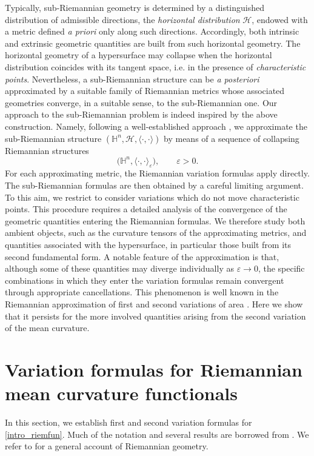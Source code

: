 \documentclass[11pt]{amsart}
\newcommand{\hhh}{{\mathcal{H}}}
\newcommand{\hh}{{\mathbb{H}}}
\newcommand{\eps}{\varepsilon}
\theoremstyle{definition}
\theoremstyle{remark}
\numberwithin{equation}{section}
\begin{document}
\medskip
Typically, sub-Riemannian geometry is determined by a distinguished distribution of admissible directions, the \emph{horizontal distribution} $\hhh$, endowed with a metric defined \emph{a priori} only along such directions. Accordingly, both intrinsic and extrinsic geometric quantities are built from such horizontal geometry. The horizontal geometry of a hypersurface may collapse when the horizontal distribution coincides with its tangent space, i.e. in the presence of \emph{characteristic points}. Nevertheless, a sub-Riemannian structure can be \emph{a posteriori} approximated by a suitable family of Riemannian metrics whose associated geometries converge, in a suitable sense, to the sub-Riemannian one.
Our approach to the sub-Riemannian problem is indeed inspired by the above construction. Namely, following a well-established approach \cite{MR2774306,MR2262784,MR4761954,MR2043961,MR5029815}, we approximate the sub-Riemannian structure $\left(\hh^n,\hhh,\langle\cdot,\cdot\rangle\right)$ by means of a sequence of collapsing Riemannian structures $$\big(\hh^n,\langle\cdot,\cdot\rangle_\eps\big),\qquad \eps>0.$$
For each approximating metric, the Riemannian variation formulas apply directly. The sub-Riemannian formulas are then obtained by a careful limiting argument. To this aim, we restrict to consider variations which do not move characteristic points. This procedure requires a detailed analysis of the convergence of the geometric quantities entering the Riemannian formulas. We therefore study both ambient objects, such as the curvature tensors of the approximating metrics, and quantities associated with the hypersurface, in particular those built from its second fundamental form. A notable feature of the approximation is that, although some of these quantities may diverge individually as $\varepsilon\to 0$, the specific combinations in which they enter the variation formulas remain convergent through appropriate cancellations. This phenomenon is well known in the Riemannian approximation of first and second variations of area \cite{MR2723818,MR5029815}. Here we show that it persists for the more involved quantities arising from the second variation of the mean curvature.
\section{Variation formulas for Riemannian mean curvature functionals}\label{appendiceriem}
In this section, we establish first and second variation formulas for \eqref{intro_riemfun}. Much of the notation and several results are borrowed from \cite{MR4676392}. We refer to \cite{MR1138207} for a general account of Riemannian geometry.
\end{document}

